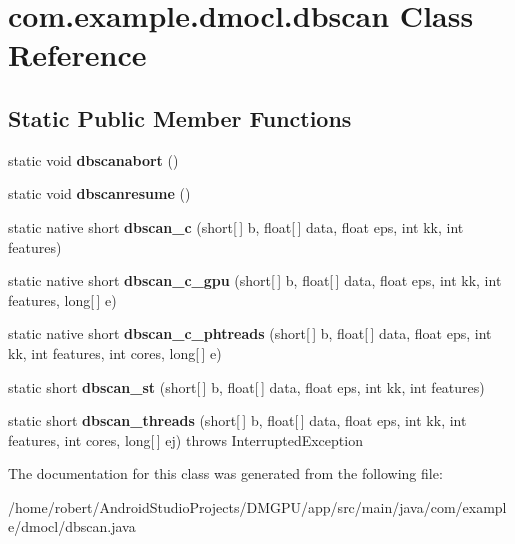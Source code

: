 \hypertarget{classcom_1_1example_1_1dmocl_1_1dbscan}{}\section{com.\+example.\+dmocl.\+dbscan Class Reference}
\label{classcom_1_1example_1_1dmocl_1_1dbscan}
\subsection*{Static Public Member Functions}
\begin{DoxyCompactItemize}
\item 
\mbox{\label{classcom_1_1example_1_1dmocl_1_1dbscan_ac0a5610d6eb5ea04f0ac297bf2fc9465}} 
static void {\bfseries dbscanabort} ()
\item 
\mbox{\label{classcom_1_1example_1_1dmocl_1_1dbscan_ae930532d5261bca83fff8c032c57460e}} 
static void {\bfseries dbscanresume} ()
\item 
\mbox{\label{classcom_1_1example_1_1dmocl_1_1dbscan_abdf678cb2bc1751842e632910df91ef2}} 
static native short {\bfseries dbscan\+\_\+c} (short\mbox{[}$\,$\mbox{]} b, float\mbox{[}$\,$\mbox{]} data, float eps, int kk, int features)
\item 
\mbox{\label{classcom_1_1example_1_1dmocl_1_1dbscan_aff87d111fa96f0cefa39304a0ac02dff}} 
static native short {\bfseries dbscan\+\_\+c\+\_\+gpu} (short\mbox{[}$\,$\mbox{]} b, float\mbox{[}$\,$\mbox{]} data, float eps, int kk, int features, long\mbox{[}$\,$\mbox{]} e)
\item 
\mbox{\label{classcom_1_1example_1_1dmocl_1_1dbscan_ae91b2a29faf3f05081f4163e27cd571a}} 
static native short {\bfseries dbscan\+\_\+c\+\_\+phtreads} (short\mbox{[}$\,$\mbox{]} b, float\mbox{[}$\,$\mbox{]} data, float eps, int kk, int features, int cores, long\mbox{[}$\,$\mbox{]} e)
\item 
\mbox{\label{classcom_1_1example_1_1dmocl_1_1dbscan_ae775963e50e6c01388ab1b1d7e604f57}} 
static short {\bfseries dbscan\+\_\+st} (short\mbox{[}$\,$\mbox{]} b, float\mbox{[}$\,$\mbox{]} data, float eps, int kk, int features)
\item 
\mbox{\label{classcom_1_1example_1_1dmocl_1_1dbscan_a966ad9839294c6c28b7e43f974592345}} 
static short {\bfseries dbscan\+\_\+threads} (short\mbox{[}$\,$\mbox{]} b, float\mbox{[}$\,$\mbox{]} data, float eps, int kk, int features, int cores, long\mbox{[}$\,$\mbox{]} ej)  throws Interrupted\+Exception 
\end{DoxyCompactItemize}


The documentation for this class was generated from the following file\+:\begin{DoxyCompactItemize}
\item 
/home/robert/\+Android\+Studio\+Projects/\+D\+M\+G\+P\+U/app/src/main/java/com/example/dmocl/dbscan.\+java\end{DoxyCompactItemize}

